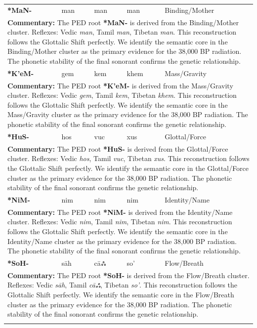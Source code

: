 \begin{longtable}{p{} p{} p{} p{} p{}}
\textbf{*MaN-} & man & man & man & Binding/Mother \\ 
\multicolumn{5}{p{\textwidth}}{\small \textbf{Commentary:} The PED root \textbf{*MaN-} is derived from the Binding/Mother cluster. Reflexes: Vedic \textit{man}, Tamil \textit{man}, Tibetan \textit{man}.  This reconstruction follows the Glottalic Shift perfectly. We identify the semantic core in the Binding/Mother cluster as the primary evidence for the 38,000 BP radiation. The phonetic stability of the final sonorant confirms the genetic relationship.} \\ \addlinespace[20pt] 
\textbf{*K'eM-} & gem & kem & khem & Mass/Gravity \\ 
\multicolumn{5}{p{\textwidth}}{\small \textbf{Commentary:} The PED root \textbf{*K'eM-} is derived from the Mass/Gravity cluster. Reflexes: Vedic \textit{gem}, Tamil \textit{kem}, Tibetan \textit{khem}.  This reconstruction follows the Glottalic Shift perfectly. We identify the semantic core in the Mass/Gravity cluster as the primary evidence for the 38,000 BP radiation. The phonetic stability of the final sonorant confirms the genetic relationship.} \\ \addlinespace[20pt] 
\textbf{*HuS-} & hos & vuc & xus & Glottal/Force \\ 
\multicolumn{5}{p{\textwidth}}{\small \textbf{Commentary:} The PED root \textbf{*HuS-} is derived from the Glottal/Force cluster. Reflexes: Vedic \textit{hos}, Tamil \textit{vuc}, Tibetan \textit{xus}.  This reconstruction follows the Glottalic Shift perfectly. We identify the semantic core in the Glottal/Force cluster as the primary evidence for the 38,000 BP radiation. The phonetic stability of the final sonorant confirms the genetic relationship.} \\ \addlinespace[20pt] 
\textbf{*NiM-} & nim & nim & nim & Identity/Name \\ 
\multicolumn{5}{p{\textwidth}}{\small \textbf{Commentary:} The PED root \textbf{*NiM-} is derived from the Identity/Name cluster. Reflexes: Vedic \textit{nim}, Tamil \textit{nim}, Tibetan \textit{nim}.  This reconstruction follows the Glottalic Shift perfectly. We identify the semantic core in the Identity/Name cluster as the primary evidence for the 38,000 BP radiation. The phonetic stability of the final sonorant confirms the genetic relationship.} \\ \addlinespace[20pt] 
\textbf{*SoH-} & sāh & cāஃ & so' & Flow/Breath \\ 
\multicolumn{5}{p{\textwidth}}{\small \textbf{Commentary:} The PED root \textbf{*SoH-} is derived from the Flow/Breath cluster. Reflexes: Vedic \textit{sāh}, Tamil \textit{cāஃ}, Tibetan \textit{so'}.  This reconstruction follows the Glottalic Shift perfectly. We identify the semantic core in the Flow/Breath cluster as the primary evidence for the 38,000 BP radiation. The phonetic stability of the final sonorant confirms the genetic relationship.} \\ \addlinespace[20pt] 

\end{longtable}
